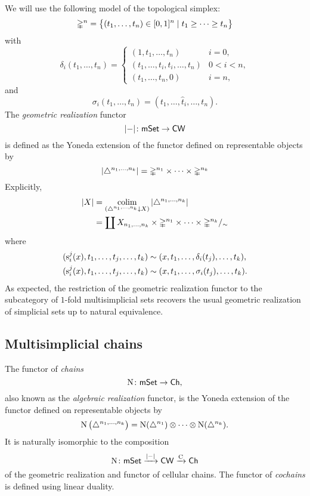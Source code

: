 We will use the following model of the topological simplex:
\[
\mathbb{\Delta}^n = \big\{
(t_1, \dots, t_n) \in [0,1]^n \mid t_1 \geq \dots \geq t_n
\big\}
\]
with
\[
\delta_i(t_1, \dots, t_n) =
\begin{cases}
	(1, t_1, \dots, t_n) & i = 0, \\
	(t_1, \dots, t_i, t_i, \dots, t_n) & 0 < i < n, \\
	(t_1, \dots, t_n, 0) & i = n,
\end{cases}
\]
and
\[
\sigma_i(t_1, \dots, t_n) = (t_1, \dots, \widehat t_i, \dots, t_n).
\]
The \textit{geometric realization} functor
\[
\lvert-\rvert \colon \mathsf{mSet} \to \mathsf{CW}
\]
is defined as the Yoneda extension of the functor defined on representable objects by
\[
\lvert\triangle^{n_1,\dots,n_k}\rvert =
\mathbb{\Delta}^{n_1}\times\dots\times\mathbb{\Delta}^{n_k}
\]
Explicitly,
\begin{align*}
	\bars{X} &=
	\colim_{\cramped{(\simplex^{n_1,\dots,n_k} \downarrow X})} \, \bars{\simplex^{n_1,\dots,n_k}} \\ &=
	\coprod X_{n_1,\dots,n_k} \times \gmsimplex{n_1}{n_k} /_\sim
\end{align*}
where
\[
\begin{split}
	(\operatorname{s}_i^j(x), t_1, \dots, t_j, \dots, t_k) &\sim (x, t_1, \dots, \delta_i(t_j), \dots, t_k), \\
	(\operatorname{s}^j_i(x), t_1, \dots, t_j, \dots, t_k) &\sim (x, t_1, \dots, \sigma_i(t_j), \dots, t_k).
\end{split}
\]
As expected, the restriction of the geometric realization functor to the subcategory of $1$-fold multisimplicial sets recovers the usual geometric realization of simplicial sets up to natural equivalence.


\subsection{Multisimplicial chains}

The functor of \textit{chains}
\[
\operatorname{N} \colon \mathsf{mSet} \to \mathsf{Ch},
\]
also known as the \textit{algebraic realization} functor, is the Yoneda extension of the functor defined on representable objects by
\[
\operatorname{N} \big( \triangle^{n_1, \dots, n_k} \big) =
\operatorname{N}(\triangle^{n_1}) \otimes \dotsb \otimes \operatorname{N}(\triangle^{n_k}).
\]
It is naturally isomorphic to the composition
\[
\operatorname{N} \colon \mathsf{mSet} \xrightarrow{\lvert-\rvert} \mathsf{CW} \xrightarrow{\operatorname{C}} \mathsf{Ch}
\]
of the geometric realization and functor of cellular chains.
The functor of \textit{cochains} is defined using linear duality.


